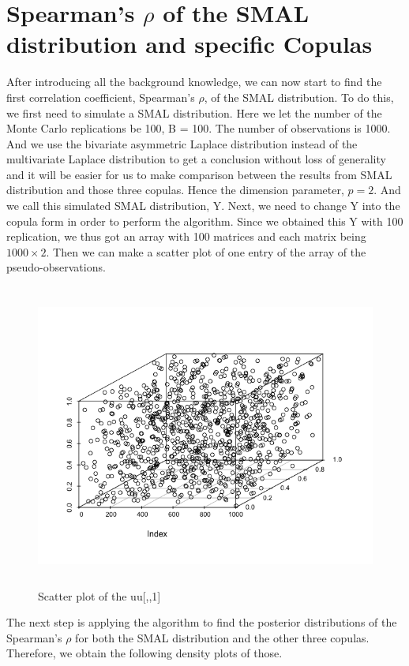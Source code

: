 \documentclass[mstat,12pt]{unswthesis}  %
\numberwithin{equation}{section}
\begin{document}
\section{Spearman's $\rho$ of the SMAL distribution and specific Copulas}
After introducing all the background knowledge, we can now start to find the first correlation coefficient, Spearman's $\rho$, of the SMAL distribution. To do this, we first need to simulate a SMAL distribution. Here we let the number of the Monte Carlo replications be 100, B = 100. The number of observations is 1000. And we use the bivariate asymmetric Laplace distribution instead of the multivariate Laplace distribution to get a conclusion without loss of generality and it will be easier for us to make comparison between the results from SMAL distribution and those three copulas. Hence the dimension parameter, $p=2$. And we call this simulated SMAL distribution, Y. Next, we need to change Y into the copula form in order to perform the algorithm. Since we obtained this Y with 100 replication, we thus got an array with 100 matrices and each matrix being $1000 \times 2$. Then we can make a scatter plot of one entry of the array of the pseudo-observations. 
\newpage
\begin{figure}[h]
\centering
  \includegraphics[width=12cm,height=10cm]{scatterSMAL.png}  
  \caption{Scatter plot of the uu[,,1]}
\end{figure}
The next step is applying the algorithm to find the posterior distributions of the Spearman's $\rho$ for both the SMAL distribution and the other three copulas. Therefore, we obtain the following density plots of those. \\
\end{document}
